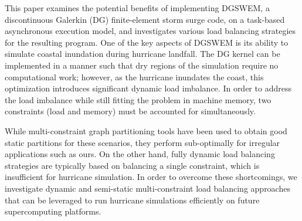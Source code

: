 This paper examines the potential benefits of implementing DGSWEM, a discontinuous Galerkin (DG) finite-element storm surge code, on a task-based asynchronous execution model, and investigates various load balancing strategies for the resulting program.
One of the key aspects of DGSWEM is its ability to simulate coastal inundation during hurricane landfall.
The DG kernel can be implemented in a manner such that dry regions of the simulation require no computational work; however, as the hurricane inundates the coast, this optimization introduces significant dynamic load imbalance.
In order to address the load imbalance while still fitting the problem in machine memory, two constraints (load and memory) must be accounted for simultaneously.

While multi-constraint graph partitioning tools have been used to obtain good static partitions for these scenarios, they perform sub-optimally for irregular applications such as ours.
On the other hand, fully dynamic load balancing strategies are typically based on balancing a single constraint, which is insufficient for hurricane simulation.
In order to overcome these shortcomings, we investigate dynamic and semi-static multi-constraint load balancing approaches that can be leveraged to run hurricane simulations efficiently on future supercomputing platforms.

